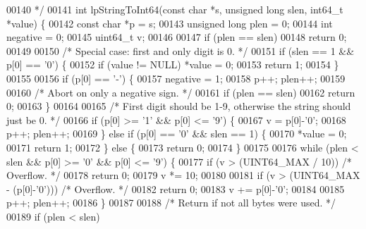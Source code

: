 \begin{DoxyCode}
00140 \textcolor{comment}{ */}
00141 \textcolor{keywordtype}{int} lpStringToInt64(\textcolor{keyword}{const} \textcolor{keywordtype}{char} *s, \textcolor{keywordtype}{unsigned} \textcolor{keywordtype}{long} slen, int64\_t *value) \{
00142     \textcolor{keyword}{const} \textcolor{keywordtype}{char} *p = s;
00143     \textcolor{keywordtype}{unsigned} \textcolor{keywordtype}{long} plen = 0;
00144     \textcolor{keywordtype}{int} negative = 0;
00145     uint64\_t v;
00146 
00147     \textcolor{keywordflow}{if} (plen == slen)
00148         \textcolor{keywordflow}{return} 0;
00149 
00150     \textcolor{comment}{/* Special case: first and only digit is 0. */}
00151     \textcolor{keywordflow}{if} (slen == 1 && p[0] == \textcolor{stringliteral}{'0'}) \{
00152         \textcolor{keywordflow}{if} (value != NULL) *value = 0;
00153         \textcolor{keywordflow}{return} 1;
00154     \}
00155 
00156     \textcolor{keywordflow}{if} (p[0] == \textcolor{stringliteral}{'-'}) \{
00157         negative = 1;
00158         p++; plen++;
00159 
00160         \textcolor{comment}{/* Abort on only a negative sign. */}
00161         \textcolor{keywordflow}{if} (plen == slen)
00162             \textcolor{keywordflow}{return} 0;
00163     \}
00164 
00165     \textcolor{comment}{/* First digit should be 1-9, otherwise the string should just be 0. */}
00166     \textcolor{keywordflow}{if} (p[0] >= \textcolor{stringliteral}{'1'} && p[0] <= \textcolor{stringliteral}{'9'}) \{
00167         v = p[0]-\textcolor{stringliteral}{'0'};
00168         p++; plen++;
00169     \} \textcolor{keywordflow}{else} \textcolor{keywordflow}{if} (p[0] == \textcolor{stringliteral}{'0'} && slen == 1) \{
00170         *value = 0;
00171         \textcolor{keywordflow}{return} 1;
00172     \} \textcolor{keywordflow}{else} \{
00173         \textcolor{keywordflow}{return} 0;
00174     \}
00175 
00176     \textcolor{keywordflow}{while} (plen < slen && p[0] >= \textcolor{stringliteral}{'0'} && p[0] <= \textcolor{stringliteral}{'9'}) \{
00177         \textcolor{keywordflow}{if} (v > (UINT64\_MAX / 10)) \textcolor{comment}{/* Overflow. */}
00178             \textcolor{keywordflow}{return} 0;
00179         v *= 10;
00180 
00181         \textcolor{keywordflow}{if} (v > (UINT64\_MAX - (p[0]-\textcolor{stringliteral}{'0'}))) \textcolor{comment}{/* Overflow. */}
00182             \textcolor{keywordflow}{return} 0;
00183         v += p[0]-\textcolor{stringliteral}{'0'};
00184 
00185         p++; plen++;
00186     \}
00187 
00188     \textcolor{comment}{/* Return if not all bytes were used. */}
00189     \textcolor{keywordflow}{if} (plen < slen)

\end{DoxyCode}
